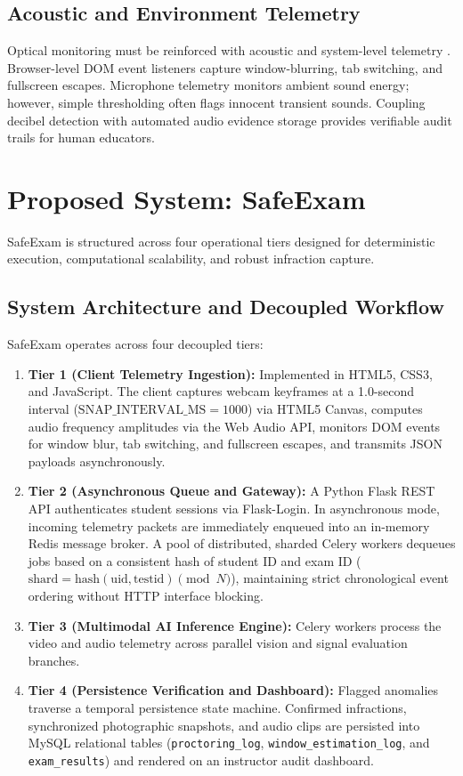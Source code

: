 \documentclass[conference]{IEEEtran}
\begin{document}
\subsection{Acoustic and Environment Telemetry}
Optical monitoring must be reinforced with acoustic and system-level telemetry \cite{multimodal}. Browser-level DOM event listeners capture window-blurring, tab switching, and fullscreen escapes. Microphone telemetry monitors ambient sound energy; however, simple thresholding often flags innocent transient sounds. Coupling decibel detection with automated audio evidence storage provides verifiable audit trails for human educators.

\section{Proposed System: SafeExam}
SafeExam is structured across four operational tiers designed for deterministic execution, computational scalability, and robust infraction capture.

\subsection{System Architecture and Decoupled Workflow}
SafeExam operates across four decoupled tiers:
\begin{enumerate}
    \item \textbf{Tier 1 (Client Telemetry Ingestion):} Implemented in HTML5, CSS3, and JavaScript. The client captures webcam keyframes at a 1.0-second interval ($\text{SNAP\_INTERVAL\_MS} = 1000$) via HTML5 Canvas, computes audio frequency amplitudes via the Web Audio API, monitors DOM events for window blur, tab switching, and fullscreen escapes, and transmits JSON payloads asynchronously.
    \item \textbf{Tier 2 (Asynchronous Queue and Gateway):} A Python Flask REST API authenticates student sessions via Flask-Login. In asynchronous mode, incoming telemetry packets are immediately enqueued into an in-memory Redis message broker. A pool of distributed, sharded Celery workers dequeues jobs based on a consistent hash of student ID and exam ID ($\text{shard} = \text{hash}(\text{uid}, \text{testid}) \pmod N$), maintaining strict chronological event ordering without HTTP interface blocking.
    \item \textbf{Tier 3 (Multimodal AI Inference Engine):} Celery workers process the video and audio telemetry across parallel vision and signal evaluation branches.
    \item \textbf{Tier 4 (Persistence Verification and Dashboard):} Flagged anomalies traverse a temporal persistence state machine. Confirmed infractions, synchronized photographic snapshots, and audio clips are persisted into MySQL relational tables (\texttt{proctoring\_log}, \texttt{window\_estimation\_log}, and \texttt{exam\_results}) and rendered on an instructor audit dashboard.
\end{enumerate}
\end{document}

